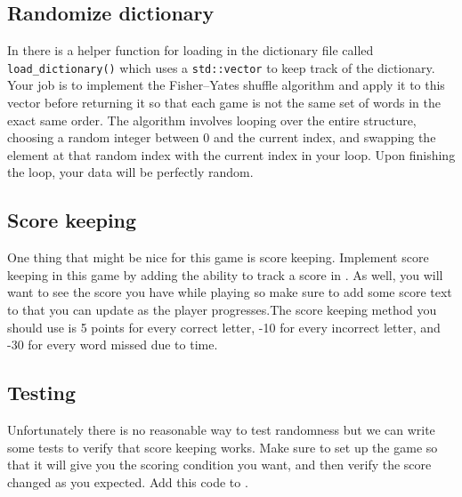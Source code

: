 \documentclass{tufte-handout}
\begin{document}
\subsection{Randomize dictionary}

In  there is a helper function for loading in the
dictionary file called \verb!load_dictionary()! which uses a \verb!std::vector!
to keep track of the dictionary. Your job is to implement the Fisher–Yates
shuffle algorithm and apply it to this vector before returning it so that each
game is not the same set of words in the exact same order. The algorithm
involves looping over the entire structure, choosing a random integer between 0
and the current index, and swapping the element at that random index with the
current index in your loop. Upon finishing the loop, your data will be
perfectly random.

\subsection{Score keeping}

One thing that might be nice for this game is score keeping. Implement score
keeping in this game by adding the ability to track a score in
. As well, you will want to see the score you have while
playing so make sure to add some score text to  that you
can update as the player progresses.The score keeping method you should use is
5 points for every correct letter, -10 for every incorrect letter, and -30 for
every word missed due to time.

\subsection{Testing}

Unfortunately there is no reasonable way to test randomness but we can write
some tests to verify that score keeping works. Make sure to set up the game so
that it will give you the scoring condition you want, and then verify the score
changed as you expected. Add this code to .
\end{document}
